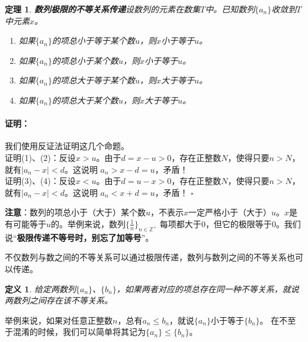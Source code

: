 \documentclass[12pt,UTF8]{ctexbook}
\newtheorem{df}{定义}[section]
\newtheorem{tm}{定理}[section]
\renewenvironment{proof}{\paragraph{\textbf{证明：}}}{\hfill$\square$}
\begin{document}
\begin{appendix}
\begin{tm}{\textbf{数列极限的不等关系传递}}\label{tm:a-0-40}
    设数列的元素在数集$T$中。已知数列$\{a_n\}$收敛到$T$中元素$x$。
    \begin{enumerate}
        \item 如果$\{a_n\}$的项总小于等于某个数$u$，则$x$小于等于$u$。
        \item 如果$\{a_n\}$的项总小于某个数$u$，则$x$小于等于$u$。
        \item 如果$\{a_n\}$的项总大于等于某个数$u$，则$x$大于等于$u$。
        \item 如果$\{a_n\}$的项总大于某个数$u$，则$x$大于等于$u$。
    \end{enumerate}
\end{tm}
\begin{proof}
    我们使用反证法证明这几个命题。\\
    证明(1)、(2)：反设$x > u$。由于$d = x - u > 0$，存在正整数$N$，使得只要$n>N$，就有$|a_n - x| < d$。这说明
    $a_n > x - d = u$，矛盾！\\
    证明(3)、(4)：反设$x < u$。由于$d = u - x > 0$，存在正整数$N$，使得只要$n>N$，就有$|a_n - x| < d$。这说明
    $a_n < x + d = u$，矛盾！
\end{proof}

\textbf{注意}：数列的项总小于（大于）某个数$u$，不表示$x$一定严格小于（大于）$u$。$x$是有可能等于$u$的。举例来说，数列$\{\frac{1}{n}\}_{n\in\mathbb{Z}^+}$
每项都大于$0$，但它的极限等于$0$。我们说“\textbf{极限传递不等号时，别忘了加等号}”。

不仅数列与数之间的不等关系可以通过极限传递，数列与数列之间的不等关系也可以传递。

\begin{df}
    给定两数列$\{a_n\}$、$\{b_n\}$，如果两者对应的项总存在同一种不等关系，就说两数列之间存在该不等关系。
\end{df}
举例来说，如果对任意正整数$n$，总有$a_n \leqslant b_n$，就说$\{a_n\}$小于等于$\{b_n\}$。
在不至于混淆的时候，我们可以简单将其记为$\{a_n\} \leqslant \{b_n\}$。


\end{appendix}
\end{document}
